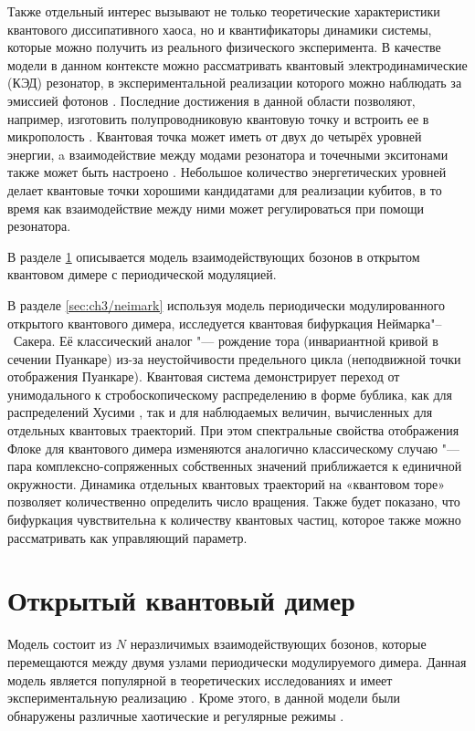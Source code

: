 Также отдельный интерес вызывают не только теоретические характеристики квантового диссипативного хаоса, но и квантификаторы динамики системы, которые можно получить из реального физического эксперимента. 
В качестве модели в данном контексте можно рассматривать  квантовый электродинамические (КЭД) резонатор, в экспериментальной реализации которого можно наблюдать за эмиссией фотонов \cite{Walther2006, Arakawa2015}.
Последние достижения в данной области позволяют, например, изготовить полупроводниковую квантовую точку и встроить ее в микрополость \cite{Arakawa2015}. 
Квантовая точка может иметь от двух до четырёх уровней энергии, a взаимодействие между модами резонатора и точечными экситонами также может быть настроено \cite{Reithmaier2004, Hennessy2007}. 
Небольшое количество энергетических уровней делает квантовые точки хорошими кандидатами для реализации кубитов, в то время как взаимодействие между ними может регулироваться при помощи резонатора.

В разделе \cref{sec:ch3/dimer} описывается модель взаимодействующих бозонов в открытом квантовом димере с периодической модуляцией.

В разделе \cref{sec:ch3/neimark} используя модель периодически модулированного открытого квантового димера, исследуется квантовая бифуркация Неймарка"--~Сакера. 
Её классический аналог "--- рождение тора (инвариантной кривой в сечении Пуанкаре) из-за неустойчивости предельного цикла (неподвижной точки отображения Пуанкаре).
Квантовая система демонстрирует переход от унимодального к стробоскопическому распределению в форме бублика, как для распределений Хусими \cite{Stockmann2006}, так и для наблюдаемых величин, вычисленных для отдельных квантовых траекторий. 
При этом спектральные свойства отображения Флоке для квантового димера изменяются аналогично классическому случаю "---  пара комплексно-сопряженных собственных значений приближается к единичной окружности. 
Динамика отдельных квантовых траекторий на «квантовом торе» позволяет количественно определить число вращения.
Также будет показано, что бифуркация чувствительна к количеству квантовых частиц, которое также можно рассматривать как управляющий параметр.

\section{Открытый квантовый димер}\label{sec:ch3/dimer}
Модель состоит из \(N\) неразличимых взаимодействующих бозонов, которые перемещаются между двумя узлами периодически модулируемого димера. 
Данная модель является популярной в теоретических исследованиях \cite{Vardi2001, Trimborn2008, Poletti2012} и имеет экспериментальную реализацию \cite{Gross2010, Tomkovic2017}. Кроме этого, в данной модели были обнаружены различные хаотические и регулярные режимы \cite{Hartmann2017, Ivanchenko2017, Carlo2017, Wang2018}. 


